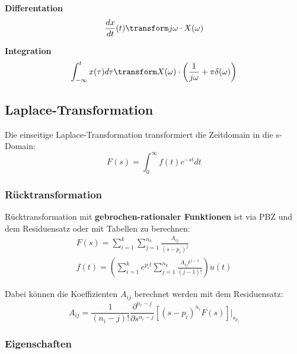 \noindent\textbf{Differentation}
\begin{align*}
	\frac{dx}{dt}(t) \transform j\omega \cdot X(\omega)
\end{align*}

\noindent\textbf{Integration}
\begin{align*}
	\int_{-\infty}^{t}x(\tau)d\tau \transform X(\omega)\cdot \left(\frac{1}{j\omega} + \pi \delta(\omega)\right)
\end{align*}

\subsection{Laplace-Transformation}
 Die einseitige Laplace-Transformation transformiert die Zeitdomain in die s-Domain:
\[
F(s) = \int_{0}^{\infty}f(t)e^{-st}dt
\]

\subsubsection{Rücktransformation}
 Rücktransformation mit \textbf{gebrochen-rationaler Funktionen} ist via PBZ und dem Residuensatz oder mit Tabellen  zu berechnen:
\begin{align*}
	F(s) = \sum_{i=1}^{k}\sum_{j=1}^{n_k}\frac{A_{ij}}{(s-p_i)^j} \\
	f(t) = \left(\sum_{i=1}^{k}e^{p_it}\sum_{j=1}^{n_k}\frac{A_{ij}t^{j-1}}{(j-1)!}\right)u(t)
\end{align*}

Dabei können die Koeffizienten $A_{ij}$ berechnet werden mit dem Residuensatz:
\[
A_{ij} = \frac{1}{(n_i - j)!}\frac{\partial^{n_i-j}}{\partial s^{n_i -j}}[(s-{p_i})^{n_i}F(s)]|_{s_{p_i}}
\]

\subsubsection{Eigenschaften}
